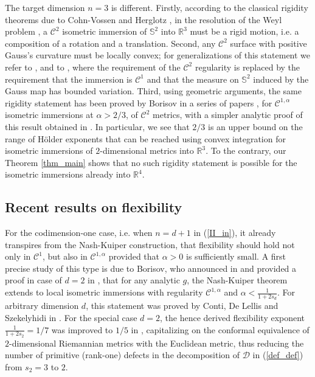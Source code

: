 \documentclass[reqno,twoside,11pt]{amsart}
\newcommand{\R}{\mathbb{R}}
\numberwithin{equation}{section}
\theoremstyle{plain}
\theoremstyle{definition}
\begin{document}
The target dimension $n=3$ is different. Firstly, according to the classical
rigidity theorems due to Cohn-Vossen \cite{CV} and Herglotz
\cite{Her}, in the resolution of the Weyl problem \cite{Weyl}, a
$\mathcal{C}^2$ isometric immersion of $\mathbb{S}^2$ into $\R^3$ must
be a rigid motion, i.e. a composition
of a rotation and a translation. Second, any $\mathcal{C}^2$ surface
with positive Gauss's curvature must be locally convex; for
generalizations of this statement we refer to \cite{HarNir}, and 
to \cite[Chapter II]{Pogo1}, \cite[Chapter IX]{Pogo2}
where the requirement of the $\mathcal{C}^2$ regularity is
replaced by the requirement that the immersion is $\mathcal{C}^1$ 
and that the measure on $\mathbb{S}^2$ induced by the Gauss map has
bounded variation.
Third, using geometric arguments, the same rigidity statement has been
proved by Borisov in a series of papers \cite{Bor1, Bor2, Bor3, Bor4, Bor5}, for
$\mathcal{C}^{1,\alpha}$ isometric immersions at $\alpha>2/3$, of
$\mathcal{C}^2$ metrics, with a simpler
analytic proof of this result obtained in \cite{CDS}.
In particular, we see that $2/3$ is an upper bound
on the range of H\"older exponents that can be reached using convex
integration for isometric immersions of $2$-dimensional metrics into
$\R^3$. To the contrary, our Theorem \ref{thm_main} shows that no such
rigidity statement is possible for the isometric immersions already into $\R^4$.

\medskip

\subsection{Recent results on flexibility} 
For the codimension-one case, i.e. when $n=d+1$ in (\ref{II_in}), it
already transpires from the Nash-Kuiper construction, that flexibility
should hold not only in $\mathcal{C}^1$, but also in
$\mathcal{C}^{1,\alpha}$ provided that $\alpha>0$
is sufficiently small. A first precise study of this type is due to
 Borisov, who announced in \cite{Bor6} and provided a
proof in case of $d=2$ in \cite{Bor7}, that for any analytic $g$,
the Nash-Kuiper theorem extends to local isometric immersions with regularity
$\mathcal{C}^{1,\alpha}$ and $\alpha<\frac{1}{1+2s_d}$. For arbitrary
dimension $d$, this statement
was proved by Conti, De Lellis and Szekelyhidi
in \cite{CDS}. For the special case $d=2$, the hence derived flexibility
exponent $\frac{1}{1+2s_2} = 1/7$ was improved to $1/5$ in \cite{DIS1/5},
capitalizing on the conformal equivalence of $2$-dimensional Riemannian
metrics with the Euclidean metric, thus reducing the number of
primitive (rank-one) defects in the decomposition of
$\mathcal{D}$ in  (\ref{def_def}) from $s_2=3$ to $2$. 
\end{document}

